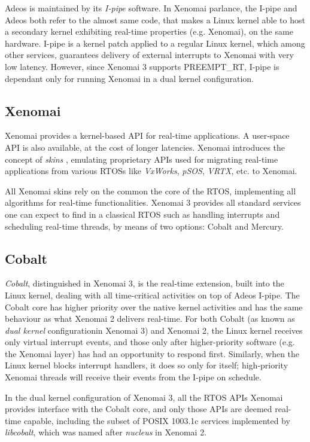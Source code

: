 \documentclass[10pt,a4paper]{article}
\begin{document}
\begin{multicols}{2}
Adeos is maintained by its \textit{I-pipe} software. In Xenomai parlance, the I-pipe and Adeos both refer to the almost same code, that makes a Linux kernel able to host a secondary kernel exhibiting real-time properties (e.g. Xenomai), on the same hardware. I-pipe is a kernel patch applied to a regular Linux kernel, which among other services, guarantees delivery of external interrupts to Xenomai with very low latency. However, since Xenomai 3 supports PREEMPT\_RT, I-pipe is dependant only for running Xenomai in a dual kernel configuration.

\subsection{Xenomai}

Xenomai provides a kernel-based API for real-time applications. A user-space API is also available, at the cost of longer latencies. Xenomai introduces the concept of \textit{skins} \cite{ChameleonRTOS}, emulating proprietary APIs used for migrating real-time applications from various RTOSs like \textit{VxWorks}, \textit{pSOS}, \textit{VRTX}, etc. to Xenomai.

All Xenomai skins rely on the common the core of the RTOS, implementing all algorithms for real-time functionalities. Xenomai 3 provides all standard services one can expect to find in a classical RTOS such as handling interrupts and scheduling real-time threads, by means of two options: Cobalt and Mercury.

\subsection{Cobalt}

\textit{Cobalt}, distinguished in Xenomai 3, is the real-time extension, built into the Linux kernel, dealing with all time-critical activities on top of Adeos I-pipe. The Cobalt core has higher priority over the native kernel activities and has the same behaviour as what Xenomai 2 delivers real-time. For both Cobalt (as known as \textit{dual kernel} configurationin Xenomai 3) and Xenomai 2, the Linux kernel receives only virtual interrupt events, and those only after higher-priority software (e.g. the Xenomai layer) has had an opportunity to respond first. Similarly, when the Linux kernel blocks interrupt handlers, it does so only for itself; high-priority Xenomai threads will receive their events from the I-pipe on schedule.

In the dual kernel configuration of Xenomai 3, all the RTOS APIs Xenomai provides interface with the Cobalt core, and only those APIs are deemed real-time capable, including the subset of POSIX 1003.1c \cite{posix-1003-1c} services implemented by \textit{libcobalt}, which was named after \textit{nucleus} in Xenomai 2.


\end{multicols}
\end{document}
